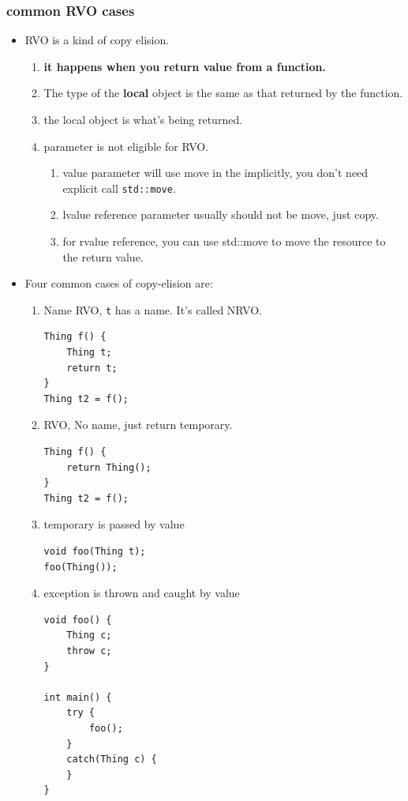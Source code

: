 \documentclass[a4paper,11pt,twoside]{book}
\begin{document}
\subsubsection{common RVO cases}
\begin{itemize}
	\item RVO is a kind of copy elision. 
	\begin{enumerate}
		\item \textbf{it happens when you return value from a function.}
		\item The type of the \textbf{local} object is the same as that returned by the function.
		\item the local object is what's being returned.
		\item parameter is not eligible for RVO. 
		\begin{enumerate}
			\item value parameter will use move in the implicitly, you don't need explicit call \texttt{std::move}.
			\item lvalue reference parameter usually should not be move, just copy.
			\item for rvalue reference, you can use std::move to move the resource to the return value.
		\end{enumerate}
	\end{enumerate}
	
	\item Four common cases of copy-elision are:
	\begin{enumerate}
		\item Name RVO, \texttt{t} has a name. It's called NRVO.
\begin{lstlisting}[numbers=none]
Thing f() {
	Thing t;
	return t;
}
Thing t2 = f();
\end{lstlisting}

		\item RVO, No name, just return temporary.
\begin{lstlisting}[numbers=none]
Thing f() {
	return Thing();
}
Thing t2 = f();
\end{lstlisting}

		\item temporary is passed by value
\begin{lstlisting}[numbers=none]
void foo(Thing t);
foo(Thing());
\end{lstlisting}

\item exception is thrown and caught by value
\begin{lstlisting}[numbers=none]
void foo() {
	Thing c;
	throw c;
}

int main() {
	try {
		foo();
	}
	catch(Thing c) {  
	}             
}
\end{lstlisting}

	\end{enumerate}

\end{itemize}
\end{document}
